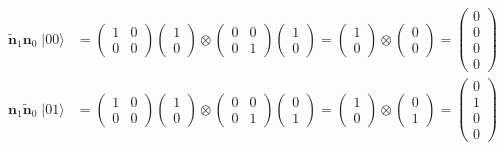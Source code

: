 \documentclass{article}
\begin{document}
\begin{align*}
\bm{\widetilde{n}}_1\bm{n}_0 \; |00\rangle
  &= \begin{pmatrix}1 & 0\\0 & 0\end{pmatrix}
     \begin{pmatrix}1\\0\end{pmatrix}
     \otimes
     \begin{pmatrix}0 & 0\\0 & 1\end{pmatrix}
     \begin{pmatrix}1\\0\end{pmatrix}
     = \begin{pmatrix}1\\0\end{pmatrix}
     \otimes
     \begin{pmatrix}0\\0\end{pmatrix}
     = \begin{pmatrix}0\\0\\0\\0\end{pmatrix}\\
\bm{n}_1\bm{\widetilde{n}}_0 \; |01\rangle
  &= \begin{pmatrix}1 & 0\\0 & 0\end{pmatrix}
     \begin{pmatrix}1\\0\end{pmatrix}
     \otimes
     \begin{pmatrix}0 & 0\\0 & 1\end{pmatrix}
     \begin{pmatrix}0\\1\end{pmatrix}
     = \begin{pmatrix}1\\0\end{pmatrix}
     \otimes
     \begin{pmatrix}0\\1\end{pmatrix}
     = \begin{pmatrix}0\\1\\0\\0\end{pmatrix}

\end{align*}
\end{document}
